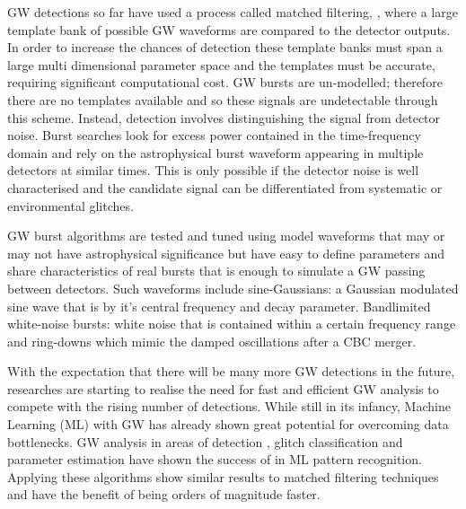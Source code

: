 \documentclass[12pt]{iopart}
\newcommand{\chris}[1]{\textbf{\textcolor{green}{CHRIS: #1}}}
\begin{document}
GW detections so far have used a process called matched filtering, \cite{Owen1998}, where a large template bank of possible GW waveforms are compared to the detector outputs. In order to increase the chances of detection these template banks must span a large multi dimensional parameter space and the templates must be accurate, requiring significant computational cost.  GW bursts are un-modelled; therefore there are no templates available and so these signals are undetectable through this scheme. Instead, detection involves distinguishing
the signal from detector noise. Burst searches look for excess power contained in the time-frequency domain and rely on the astrophysical burst waveform appearing in multiple detectors at similar times. This is only possible if the detector noise is
well characterised and the candidate signal can be differentiated from
systematic or environmental glitches. 

%
\ac{GW} burst algorithms \cite{Klimenko_2008, Aso_2008} are tested and tuned using model waveforms that may
or may not have astrophysical significance but have easy to define parameters
and share characteristics of real bursts that is enough to simulate a \ac{GW} passing between detectors. Such waveforms include sine-Gaussians: a Gaussian modulated sine wave that is by it's central frequency and decay parameter. Bandlimited white-noise bursts: white noise that is contained within a certain frequency range and ring-downs which mimic the damped oscillations after a CBC merger.

%

With the expectation that there will be many more \ac{GW} detections in the future, researches are starting to realise the need for fast and efficient \ac{GW} analysis to compete with the rising number of detections. While still in its infancy, Machine Learning (ML) with GW has already shown great potential for overcoming data bottlenecks. \ac{GW} analysis in areas of detection \cite{Gabbard2017,Gebhard_2019,Krastev_2020}, glitch classification \cite{Bahaadini, George_2018,Razzano_2018} and parameter estimation \cite{gabbard2019bayesian,shen2019deterministic,green2020gravitationalwave} have shown the success of in ML pattern recognition. Applying these algorithms show similar results to matched filtering techniques and have the benefit of being orders of magnitude faster. 
\end{document}
